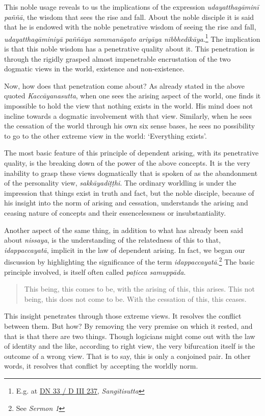 This noble usage reveals to us the implications of the expression \emph{udayatthagāminī paññā}, the wisdom that sees the rise and fall. About the noble disciple it is said that he is endowed with the noble penetrative wisdom of seeing the rise and fall, \emph{udayatthagāminiyā paññāya sammanāgato ariyāya nibbhedikāya}.\footnote{E.g. at \href{https://suttacentral.net/dn33/pli/ms}{DN 33 / D III 237}, \emph{Sangītisutta}} The implication is that this noble wisdom has a penetrative quality about it. This penetration is through the rigidly grasped almost impenetrable encrustation of the two dogmatic views in the world, existence and non-existence.

Now, how does that penetration come about? As already stated in the above quoted \emph{Kaccāyanasutta}, when one sees the arising aspect of the world, one finds it impossible to hold the view that nothing exists in the world. His mind does not incline towards a dogmatic involvement with that view. Similarly, when he sees the cessation of the world through his own six sense bases, he sees no possibility to go to the other extreme view in the world: `Everything exists'.

The most basic feature of this principle of dependent arising, with its penetrative quality, is the breaking down of the power of the above concepts. It is the very inability to grasp these views dogmatically that is spoken of as the abandonment of the personality view, \emph{sakkāyadiṭṭhi}. The ordinary worldling is under the impression that things exist in truth and fact, but the noble disciple, because of his insight into the norm of arising and cessation, understands the arising and ceasing nature of concepts and their essencelessness or insubstantiality.

Another aspect of the same thing, in addition to what has already been said about \emph{nissaya}, is the understanding of the relatedness of this to that, \emph{idappaccayatā}, implicit in the law of dependent arising. In fact, we began our discussion by highlighting the significance of the term \emph{idappaccayatā}.\footnote{See \emph{Sermon 1}} The basic principle involved, is itself often called \emph{paṭicca samuppāda}.

\begin{quote}
This being, this comes to be, with the arising of this, this arises. This not being, this does not come to be. With the cessation of this, this ceases.
\end{quote}

This insight penetrates through those extreme views. It resolves the conflict between them. But how? By removing the very premise on which it rested, and that is that there are two things. Though logicians might come out with the law of identity and the like, according to right view, the very bifurcation itself is the outcome of a wrong view. That is to say, this is only a conjoined pair. In other words, it resolves that conflict by accepting the worldly norm.


